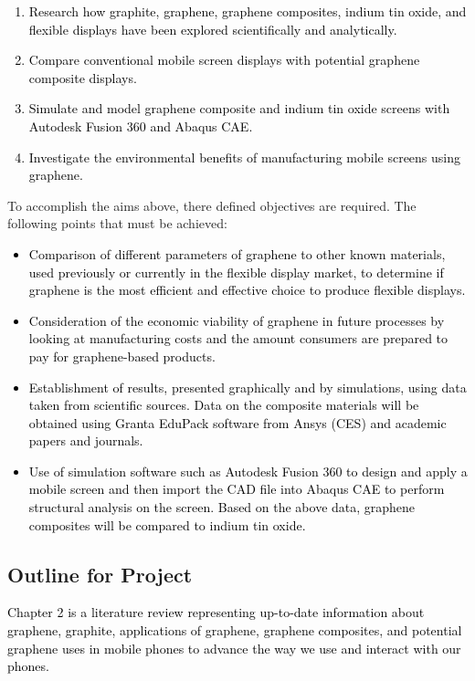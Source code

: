 \documentclass[a4paper,12pt]{article}
\numberwithin{equation}{section}
\numberwithin{figure}{section}
\begin{document}
\textcolor{black}{\begin{enumerate}
\item Research how graphite, graphene, graphene composites, indium tin oxide, and flexible displays have been explored scientifically and analytically.
\item Compare conventional mobile screen displays with potential graphene composite displays.
\item Simulate and model graphene composite and indium tin oxide screens with Autodesk Fusion 360 and Abaqus CAE.
\item Investigate the environmental benefits of manufacturing mobile screens using graphene.
\end{enumerate}\vspace{\baselineskip}}

\noindent To accomplish the aims above, there defined objectives are required. The following points that must be achieved:

\textcolor{black}{\begin{itemize}
\item Comparison of different parameters of graphene to other known materials, used previously or currently in the flexible display market, to determine if graphene is the most efficient and effective choice to produce flexible displays.
\item Consideration of the economic viability of graphene in future processes by looking at manufacturing costs and the amount consumers are prepared to pay for graphene-based products.
\item Establishment of results, presented graphically and by simulations, using data taken from scientific sources. Data on the composite materials will be obtained using Granta EduPack software from Ansys (CES) and academic papers and journals.
\item Use of simulation software such as Autodesk Fusion 360 to design and apply a mobile screen and then import the CAD file into Abaqus CAE to perform structural analysis on the screen. Based on the above data, graphene composites will be compared to indium tin oxide.
\end{itemize}}

\subsection{Outline for Project}

\textcolor{black}{Chapter 2 is a literature review representing up-to-date information about graphene, graphite, applications of graphene, graphene composites, and potential graphene uses in mobile phones to advance the way we use and interact with our phones.\vspace{\baselineskip}}
\end{document}
